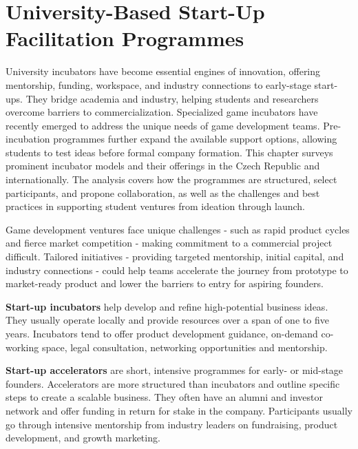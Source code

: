 \chapter{University-Based Start-Up Facilitation Programmes}

\begin{chapterabstract}
    University incubators have become essential engines of innovation, offering mentorship, funding, workspace, and industry connections to early-stage start-ups. They bridge academia and industry, helping students and researchers overcome barriers to commercialization. Specialized game incubators have recently emerged to address the unique needs of game development teams. Pre-incubation programmes further expand the available support options, allowing students to test ideas before formal company formation. This chapter surveys prominent incubator models and their offerings in the Czech Republic and internationally. The analysis covers how the programmes are structured, select participants, and propone collaboration, as well as the challenges and best practices in supporting student ventures from ideation through launch.    
\end{chapterabstract}

Game development ventures face unique challenges - such as rapid product cycles and fierce market competition - making commitment to a commercial project difficult. Tailored initiatives - providing targeted mentorship, initial capital, and industry connections - could help teams accelerate the journey from prototype to market-ready product and lower the barriers to entry for aspiring founders.

\textbf{Start-up incubators} help develop and refine high-potential business ideas. They usually operate locally and provide resources over a span of one to five years. Incubators tend to offer product development guidance, on-demand co-working space, legal consultation, networking opportunities and mentorship.

\textbf{Start-up accelerators} are short, intensive programmes for early- or mid-stage founders. Accelerators are more structured than incubators and outline specific steps to create a scalable business. They often have an alumni and investor network and offer funding in return for stake in the company. Participants usually go through intensive mentorship from industry leaders on fundraising, product development, and growth marketing.

